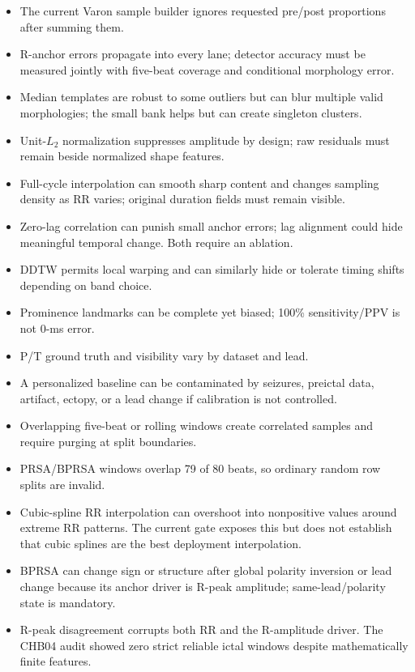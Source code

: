 \documentclass[11pt,a4paper]{article}
\begin{document}
\begin{itemize}
  \item The current Varon sample builder ignores requested pre/post proportions after summing them.
  \item R-anchor errors propagate into every lane; detector accuracy must be measured jointly with five-beat coverage and conditional morphology error.
  \item Median templates are robust to some outliers but can blur multiple valid morphologies; the small bank helps but can create singleton clusters.
  \item Unit-$L_2$ normalization suppresses amplitude by design; raw residuals must remain beside normalized shape features.
  \item Full-cycle interpolation can smooth sharp content and changes sampling density as RR varies; original duration fields must remain visible.
  \item Zero-lag correlation can punish small anchor errors; lag alignment could hide meaningful temporal change. Both require an ablation.
  \item DDTW permits local warping and can similarly hide or tolerate timing shifts depending on band choice.
  \item Prominence landmarks can be complete yet biased; 100\% sensitivity/PPV is not 0-ms error.
  \item P/T ground truth and visibility vary by dataset and lead.
  \item A personalized baseline can be contaminated by seizures, preictal data, artifact, ectopy, or a lead change if calibration is not controlled.
  \item Overlapping five-beat or rolling windows create correlated samples and require purging at split boundaries.
  \item PRSA/BPRSA windows overlap 79 of 80 beats, so ordinary random row splits are invalid.
  \item Cubic-spline RR interpolation can overshoot into nonpositive values around extreme RR patterns. The current gate exposes this but does not establish that cubic splines are the best deployment interpolation.
  \item BPRSA can change sign or structure after global polarity inversion or lead change because its anchor driver is R-peak amplitude; same-lead/polarity state is mandatory.
  \item R-peak disagreement corrupts both RR and the R-amplitude driver. The CHB04 audit showed zero strict reliable ictal windows despite mathematically finite features.
\end{itemize}
\end{document}
